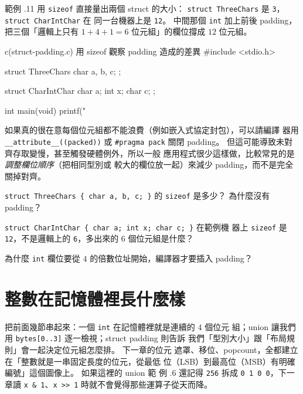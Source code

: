 範例 \thechapter.11 用 \texttt{sizeof} 直接量出兩個 struct 的大小：
\texttt{struct ThreeChars} 是 \texttt{3}，\texttt{struct CharIntChar} 在
同一台機器上是 \texttt{12}。 中間那個 \texttt{int} 加上前後 padding，
把三個「邏輯上只有 $1 + 4 + 1 = 6$ 位元組」的欄位撐成 $12$ 位元組。

\begin{example}{c}{(struct-padding.c) 用 sizeof 觀察 padding 造成的差異}
#include <stdio.h>

struct ThreeChars {
    char a, b, c;
};

struct CharIntChar {
    char a;
    int x;
    char c;
};

int main(void) {
    printf("%
}
\end{example}



如果真的很在意每個位元組都不能浪費（例如嵌入式協定封包），可以請編譯
器用 \texttt{\_\_attribute\_\_((packed))} 或 \texttt{\#pragma pack}
關閉 padding。 但這可能導致未對齊存取變慢，甚至觸發硬體例外，所以一般
應用程式很少這樣做，比較常見的是\emph{調整欄位順序}（把相同型別或
較大的欄位放一起）來減少 padding，而不是完全關掉對齊。

\begin{drills}[label=drills:ext-struct-padding]
\item \texttt{struct ThreeChars \{ char a, b, c; \}} 的 \texttt{sizeof}
是多少？ 為什麼沒有 padding？
\item \texttt{struct CharIntChar \{ char a; int x; char c; \}} 在範例機
器上 \texttt{sizeof} 是 \texttt{12}，不是邏輯上的 \texttt{6}，多出來的
$6$ 個位元組是什麼？
\item 為什麼 \texttt{int} 欄位要從 $4$ 的倍數位址開始，編譯器才要插入
padding？
\end{drills}

\section{整數在記憶體裡長什麼樣}
\label{sec:ext-int-bytes}

把前面幾節串起來：一個 \texttt{int} 在記憶體裡就是連續的 $4$ 個位元
組；union 讓我們用 \texttt{bytes[0..3]} 逐一檢視；struct padding 則告訴
我們「型別大小」跟「布局規則」會一起決定位元組怎麼排。 下一章的位元
遮罩、移位、popcount，全都建立在「整數就是一串固定長度的位元，從最低
位（LSB）到最高位（MSB）有明確編號」這個圖像上。 如果這裡的 union 範
例 \thechapter.6 還記得 \texttt{256} 拆成 \texttt{0 1 0 0}，下一章讀
\texttt{x \& 1}、\texttt{x >> 1} 時就不會覺得那些運算子從天而降。

